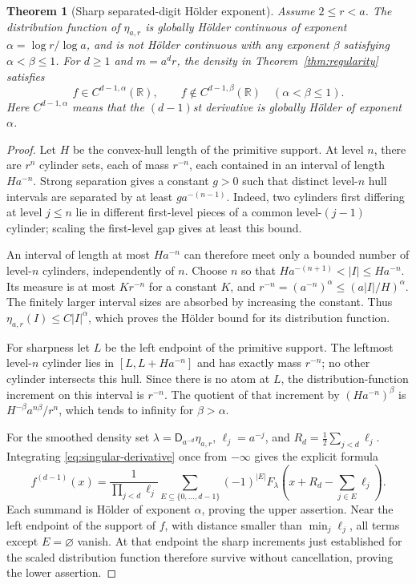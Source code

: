 \documentclass[11pt,a4paper]{article}
\newtheorem{theorem}{Theorem}[section]
\theoremstyle{definition}
\theoremstyle{remark}
\newcommand{\R}{\mathbb R}
\newcommand{\D}{\mathsf D}
\begin{document}
\begin{theorem}[Sharp separated-digit H\"older exponent]\label{thm:holder}
Assume $2\le r<a$.
The distribution function of $\eta_{a,r}$ is globally H\"older continuous
of exponent $\alpha=\log r/\log a$, and is not H\"older continuous with
any exponent $\beta$ satisfying $\alpha<\beta\le1$.
For $d\ge1$ and $m=a^dr$, the density in Theorem~\ref{thm:regularity}
satisfies
\begin{equation}\label{eq:holder}
 f\in C^{d-1,\alpha}(\R),\qquad
 f\notin C^{d-1,\beta}(\R)\quad(\alpha<\beta\le1).
\end{equation}
Here $C^{d-1,\alpha}$ means that the $(d-1)$st derivative is globally
H\"older of exponent $\alpha$.
\end{theorem}
\begin{proof}
Let $H$ be the convex-hull length of the primitive support. At level $n$,
there are $r^n$ cylinder sets, each of mass $r^{-n}$, each contained in an
interval of length $Ha^{-n}$. Strong separation gives a constant $g>0$
such that distinct level-$n$ hull intervals are separated by at least
$ga^{-(n-1)}$. Indeed, two cylinders first differing at level $j\le n$
lie in different first-level pieces of a common level-$(j-1)$ cylinder;
scaling the first-level gap gives at least this bound.

An interval of length at most $Ha^{-n}$ can therefore meet only a bounded
number of level-$n$ cylinders, independently of $n$. Choose $n$ so that
$Ha^{-(n+1)}<|I|\le Ha^{-n}$. Its measure is at most $K r^{-n}$ for a
constant $K$, and $r^{-n}=(a^{-n})^\alpha\le(a|I|/H)^\alpha$.
The finitely larger interval sizes are absorbed by increasing the
constant. Thus $\eta_{a,r}(I)\le C|I|^\alpha$, which proves the H\"older
bound for its distribution function.

For sharpness let $L$ be the left endpoint of the primitive support.
The leftmost level-$n$ cylinder lies in $[L,L+Ha^{-n}]$ and has exactly
mass $r^{-n}$; no other cylinder intersects this hull. Since there is no
atom at $L$, the distribution-function increment on this interval is
$r^{-n}$. The quotient of that increment by $(Ha^{-n})^\beta$ is
$H^{-\beta}a^{n\beta}/r^n$, which tends to infinity for $\beta>\alpha$.

For the smoothed density set $\lambda=\D_{a^{-d}}\eta_{a,r}$,
$\ell_j=a^{-j}$, and $R_d=\frac12\sum_{j<d}\ell_j$. Integrating
\eqref{eq:singular-derivative} once from $-\infty$ gives the explicit formula
\begin{equation}\label{eq:cdf-derivative}
 f^{(d-1)}(x)=\frac1{\prod_{j<d}\ell_j}
 \sum_{E\subseteq\{0,\ldots,d-1\}}(-1)^{|E|}
 F_\lambda\left(x+R_d-\sum_{j\in E}\ell_j\right).
\end{equation}
Each summand is H\"older of exponent $\alpha$, proving the upper assertion.
Near the left endpoint of the support of $f$, with distance smaller than
$\min_j\ell_j$, all terms except $E=\varnothing$ vanish. At that endpoint
the sharp increments just established for the scaled distribution function
therefore survive without cancellation, proving the lower assertion.
\end{proof}
\end{document}
